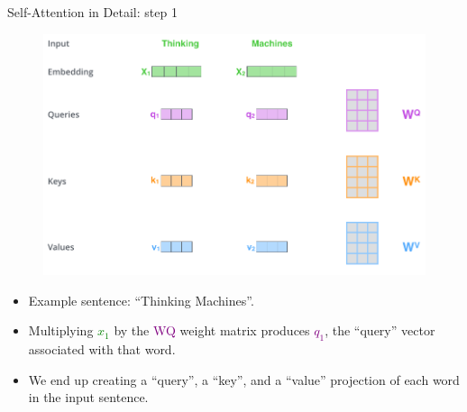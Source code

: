 \documentclass[handout]{beamer}
\begin{document}
\begin{frame}{Self-Attention in Detail: step 1}


\begin{figure}[h]
        	\includegraphics[scale = 0.3]{pics/transformer_self_attention_vectors.png}
        \end{figure}  

\begin{scriptsize}


\begin{itemize}        
\item Example sentence: ``Thinking Machines''.
\item Multiplying \textcolor{green}{$x_1$} by the \textcolor{purple}{WQ} weight matrix produces \textcolor{purple}{$q_1$}, the ``query'' vector associated with that word.
\item We end up creating a ``query'', a ``key'', and a ``value'' projection of each word in the input sentence.

\end{itemize}

\end{scriptsize}


        

\end{frame}
\end{document}
